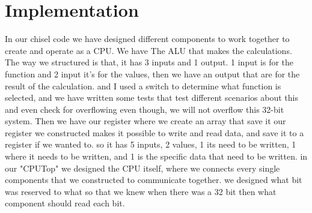 \documentclass[a4paper, english]{article}
\numberwithin{equation}{section}
\begin{document}
\section{Implementation}\label{sec:implement}
In our chisel code we have designed different components to work together to create and operate as a CPU.
We have The ALU that makes the calculations. The way we structured is that, it has 3 inputs and 1 output. 1 input is for the function and 2 input it's for the values, then we have an output that are for the result of the calculation. and I used a switch to determine what function is selected, and we have written some tests that test different scenarios about this and even check for overflowing even though, we will not overflow this 32-bit system.
Then we have our register where we create an array that save it
our register we constructed makes it possible to write and read data, and save it to a register if we wanted to. so it has 5 inputs, 2 values, 1 its need to be written, 1 where it needs to be written, and 1 is the specific data that need to be written.
in our "CPUTop" we designed the CPU itself, where we connects every single components that we constructed to communicate together. we designed what bit was reserved to what so that we knew when there was a 32 bit then what component should read each bit. 
\end{document}
